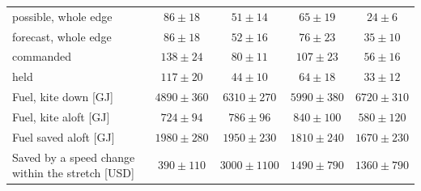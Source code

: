 \begin{tabular}{@{}lcccc@{}}
\quad possible, whole edge & \(86 \pm 18\) & \(51 \pm 14\) & \(65 \pm 19\) & \(24 \pm 6\) \\
\quad forecast, whole edge & \(86 \pm 18\) & \(52 \pm 16\) & \(76 \pm 23\) & \(35 \pm 10\) \\
\quad commanded & \(138 \pm 24\) & \(80 \pm 11\) & \(107 \pm 23\) & \(56 \pm 16\) \\
\quad held & \(117 \pm 20\) & \(44 \pm 10\) & \(64 \pm 18\) & \(33 \pm 12\) \\
Fuel, kite down [GJ] & \(4890 \pm 360\) & \(6310 \pm 270\) & \(5990 \pm 380\) & \(6720 \pm 310\) \\
Fuel, kite aloft [GJ] & \(724 \pm 94\) & \(786 \pm 96\) & \(840 \pm 100\) & \(580 \pm 120\) \\
Fuel saved aloft [GJ] & \(1980 \pm 280\) & \(1950 \pm 230\) & \(1810 \pm 240\) & \(1670 \pm 230\) \\
Saved by a speed change within the stretch [USD] & \(390 \pm 110\) & \(3000 \pm 1100\) & \(1490 \pm 790\) & \(1360 \pm 790\) \\
\bottomrule
\end{tabular}
